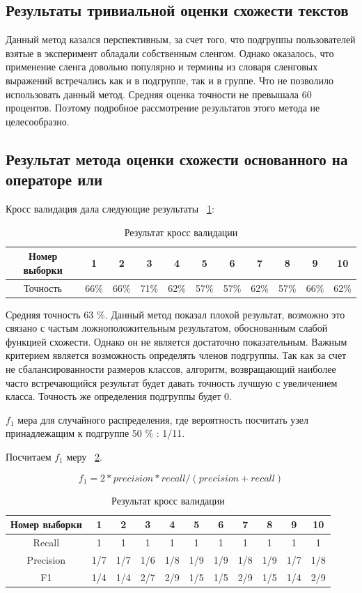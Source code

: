 \documentclass[annotation,times,page4]{itmo-student-thesis}
\begin{document}
\subsection{Результаты тривиальной оценки схожести текстов}
Данный метод казался перспективным, за счет того, что подгруппы пользователей взятые в эксперимент обладали собственным сленгом. Однако оказалось, что 
применение сленга довольно популярно и термины из словаря сленговых выражений встречались как и в подгруппе, так и в группе. Что не позволило использовать данный метод.  Средняя оценка точности не превышала 60 процентов. Поэтому подробное рассмотрение результатов этого метода не целесообразно.
 

\subsection{Результат метода оценки схожести основанного на операторе или}
Кросс валидация дала следующие результаты {~\ref{tab2}}:
\begin{table}[!h]
\caption{Результат кросс валидации}\label{tab2}
\centering
\begin{tabular}{|*{11}{c|}}\hline
Номер выборки & 1 & 2 & 3 & 4 & 5 & 6 & 7 & 8 & 9 & 10 \\\hline
Точность  & 66\% & 66\% & 71\% & 62\% & 57\% & 57\% & 62\% & 57\% & 66\% & 62\% \\\hline
\end{tabular}
\end{table}
Средняя точность 63 \%. Данный метод показал плохой результат, возможно это связано с частым ложноположительным результатом, обоснованным слабой функцией схожести. Однако он не является достаточно показательным. Важным критерием является возможность определять членов подгруппы. Так как за счет не сбалансированности размеров классов, алгоритм, возвращающий наиболее часто встречающийся результат будет давать точность лучшую с увеличением класса. Точность же определения подгруппы будет 0.

$f_{1}$ мера для случайного распределения, где вероятность посчитать узел принадлежащим к подгруппе 50 \% : 1/11.

Посчитаем $f_{1}$ меру ~\ref{tab3}.

\[
    f_{1} = 2 * precision * recall / (precision + recall)
\] 

\begin{table}[!h]
\caption{Результат кросс валидации}\label{tab3}
\centering
\begin{tabular}{|*{11}{c|}}\hline
Номер выборки & 1 & 2 & 3 & 4 & 5 & 6 & 7 & 8 & 9 & 10 \\\hline
Recall  & 1& 1& 1& 1& 1& 1& 1& 1& 1& 1\\\hline
Precision & 1/7 & 1/7& 1/6& 1/8& 1/9& 1/9& 1/8 & 1/9& 1/7& 1/8\\\hline
F1 & 1/4 & 1/4 & 2/7 & 2/9 & 1/5 & 1/5 & 2/9 & 1/5 & 1/4 & 2/9 \\\hline

\end{tabular}
\end{table}
\end{document}
